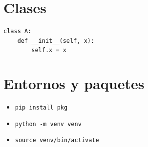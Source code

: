 \documentclass[a4paper,10pt]{article}
\begin{document}
\section*{Clases}
\begin{lstlisting}
class A:
    def __init__(self, x):
        self.x = x
\end{lstlisting}

\section*{Entornos y paquetes}
\begin{itemize}
    \item \texttt{pip install pkg}
    \item \texttt{python -m venv venv}
    \item \texttt{source venv/bin/activate}
\end{itemize}
\end{document}
